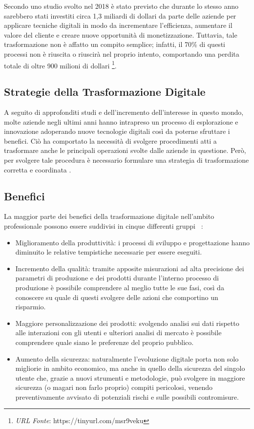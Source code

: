 Secondo uno studio svolto nel 2018 è stato previsto che durante lo stesso anno sarebbero stati investiti circa 1,3 miliardi di dollari da parte delle aziende per applicare tecniche digitali in modo da incrementare l'efficienza, aumentare il valore del cliente e creare nuove opportunità di monetizzazione. Tuttavia, tale trasformazione non è affatto un compito semplice; infatti, il 70\% di questi processi non è riuscita o riuscirà nel proprio intento, comportando  una perdita totale di oltre 900 milioni di dollari \footnote{\textit{URL Fonte}: https://tinyurl.com/msr9veku}.

\subsection{Strategie della Trasformazione Digitale}

A seguito di approfonditi studi e dell'incremento dell'interesse in questo mondo, molte aziende negli ultimi anni hanno intrapreso un processo di esplorazione e innovazione adoperando nuove tecnologie digitali così da poterne sfruttare i benefici. Ciò ha comportato la necessità di svolgere procedimenti atti a trasformare anche le principali operazioni svolte dalle aziende in questione. Però, per svolgere tale procedura è necessario formulare una strategia di trasformazione corretta e coordinata \cite{digital_transformation_strategies}.

\subsection{Benefici}

La maggior parte dei benefici della trasformazione digitale nell'ambito professionale possono essere suddivisi in cinque differenti gruppi ~\cite{sciencedirect_digital_transformation_benefits}:
\begin{itemize}
    \item Miglioramento della produttività: i processi di sviluppo e progettazione hanno diminuito le relative tempistiche necessarie per essere eseguiti.
    \item Incremento della qualità: tramite apposite misurazioni ad alta precisione dei parametri di produzione e dei prodotti durante l'interno processo di produzione è possibile comprendere al meglio tutte le sue fasi, così da conoscere su quale di questi svolgere delle azioni che comportino un risparmio.
    \item Maggiore personalizzazione dei prodotti: svolgendo analisi sui dati rispetto alle interazioni con gli utenti e ulteriori analisi di mercato è possibile comprendere quale siano le preferenze del proprio pubblico.
    \item Aumento della sicurezza: naturalmente l’evoluzione digitale porta non solo migliorie in ambito economico, ma anche in quello della sicurezza del singolo utente che, grazie a nuovi strumenti e metodologie, può svolgere in maggiore sicurezza (o magari non farlo proprio) compiti pericolosi, venendo preventivamente avvisato di potenziali rischi e sulle possibili contromisure.
\end{itemize}

